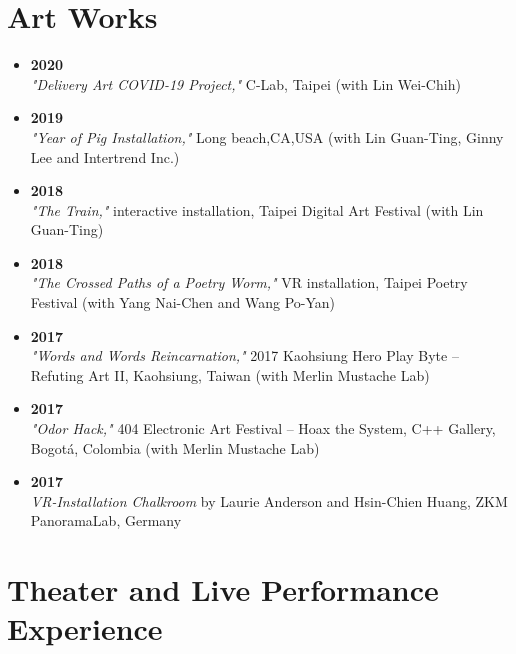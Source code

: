 \section*{Art Works}

\begin{itemize}

  \item \textbf{2020} \\
  \textit{"Delivery Art COVID-19 Project,"} C-Lab, Taipei (with Lin Wei-Chih)



\item \textbf{2019} \\
  \textit{"Year of Pig Installation,"} Long beach,CA,USA (with Lin Guan-Ting, Ginny Lee and Intertrend Inc.)   
  

  \item \textbf{2018} \\
  \textit{"The Train,"} interactive installation, Taipei Digital Art Festival (with Lin Guan-Ting)

  \item \textbf{2018} \\
  \textit{"The Crossed Paths of a Poetry Worm,"} VR installation, Taipei Poetry Festival (with Yang Nai-Chen and Wang Po-Yan)

  \item \textbf{2017} \\
  \textit{"Words and Words Reincarnation,"} 2017 Kaohsiung Hero Play Byte – Refuting Art II, Kaohsiung, Taiwan (with Merlin Mustache Lab)

  \item \textbf{2017} \\
  \textit{"Odor Hack,"} 404 Electronic Art Festival – Hoax the System, C++ Gallery, Bogotá, Colombia (with Merlin Mustache Lab)

  \item \textbf{2017} \\
  \textit{VR-Installation Chalkroom} by Laurie Anderson and Hsin-Chien Huang, ZKM PanoramaLab, Germany

\end{itemize}



\section*{Theater and Live Performance Experience}

